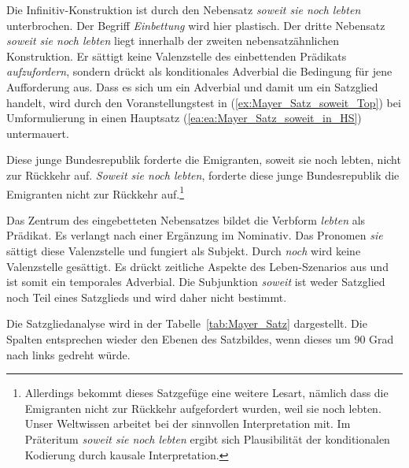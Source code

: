 Die Infinitiv-Konstruktion ist durch den Nebensatz \textit{soweit sie noch lebten} unterbrochen. Der Begriff \textit{Einbettung} wird hier plastisch. Der dritte Nebensatz \textit{soweit sie noch lebten} liegt innerhalb der zweiten nebensatzähnlichen Konstruktion. Er sättigt keine Valenzstelle des einbettenden Prädikats \textit{aufzufordern}, sondern drückt als konditionales Adverbial die Bedingung für jene Aufforderung aus. Dass es sich um ein Adverbial und damit um ein Satzglied handelt, wird durch den Voranstellungstest in (\ref{ex:Mayer_Satz_soweit_Top}) bei Umformulierung in einen Hauptsatz (\ref{ea:ea:Mayer_Satz_soweit_in_HS}) untermauert.

\ea \label{ea:ea:Mayer_Satz_soweit_Top_HS} 
\ea \label{ea:ea:Mayer_Satz_soweit_in_HS} Diese junge Bundesrepublik forderte die Emigranten, soweit sie noch lebten, nicht zur Rückkehr auf.
\ex \label{ex:Mayer_Satz_soweit_Top} \textit{Soweit sie noch lebten}, forderte diese junge Bundesrepublik die Emigranten nicht zur Rückkehr auf.\footnote{Allerdings bekommt dieses Satzgefüge eine weitere Lesart, nämlich dass die Emigranten nicht zur Rückkehr aufgefordert wurden, weil sie noch lebten. Unser Weltwissen arbeitet bei der sinnvollen Interpretation mit. Im Präteritum \textit{soweit sie noch lebten} ergibt sich Plausibilität der konditionalen Kodierung durch kausale Interpretation.}
\z 
\z 

Das Zentrum des eingebetteten Nebensatzes bildet die Verbform \textit{lebten} als Prädikat. Es verlangt nach einer Ergänzung im Nominativ. Das Pronomen \textit{sie} sättigt diese Valenzstelle und fungiert als Subjekt. Durch \textit{noch} wird keine Valenzstelle gesättigt. Es drückt zeitliche Aspekte des Leben-Szenarios aus und ist somit ein temporales Adverbial. Die Subjunktion \textit{soweit} ist weder Satzglied noch Teil eines Satzglieds und wird daher nicht bestimmt. 

Die Satzgliedanalyse wird in der Tabelle~\ref{tab:Mayer_Satz} dargestellt. Die Spalten entsprechen wieder den Ebenen des Satzbildes, wenn dieses um 90 Grad nach links gedreht würde.

